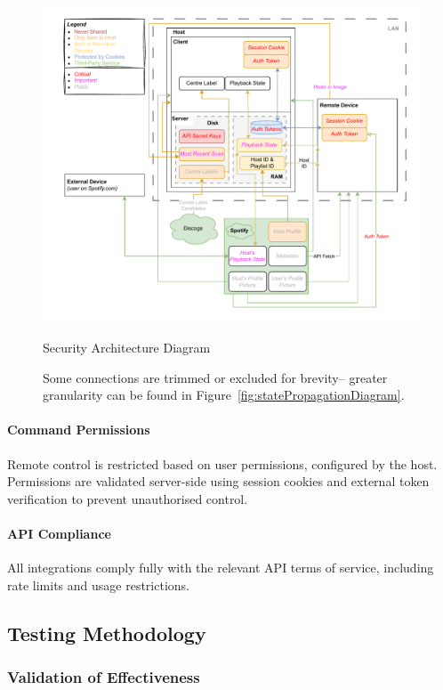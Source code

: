             \begin{figure}
                \centering
                \includegraphics[width=0.95\linewidth]{images/SecurityDiagram.pdf}
                \caption{Security Architecture Diagram}
                \label{fig:security}
                \caption*{Some connections are trimmed or excluded for brevity-- greater granularity can be found in Figure~\ref{fig:statePropagationDiagram}.}
            \end{figure}
    
            \paragraph{Command Permissions} Remote control is restricted based on user permissions, configured by the host. Permissions are validated server-side using session cookies and external token verification to prevent unauthorised control.
    
            \paragraph{API Compliance} All integrations comply fully with the relevant API terms of service, including rate limits and usage restrictions.
        
        \subsection{Testing Methodology}
            
            \subsubsection{Validation of Effectiveness}
    
